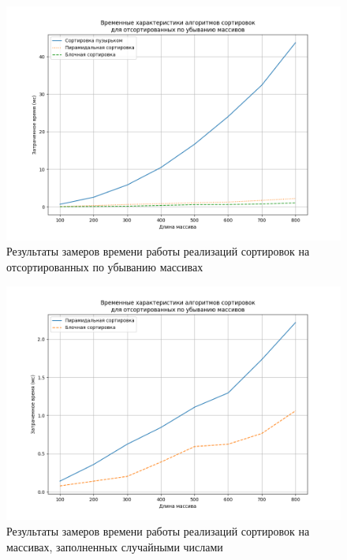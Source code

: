 \begin{figure}[h]
	\includegraphics[scale=0.5]{img/dec.png}
	\centering 
	\caption{Результаты замеров времени работы реализаций сортировок на отсортированных по убыванию массивах}
	\label{img:dec_all}
\end{figure}
\begin{figure}[h]
	\includegraphics[scale=0.5]{img/dec_two.png}
	\centering 
	\caption{Результаты замеров времени работы реализаций сортировок на массивах, заполненных случайными числами}
	\label{img:dec_two}
\end{figure}
